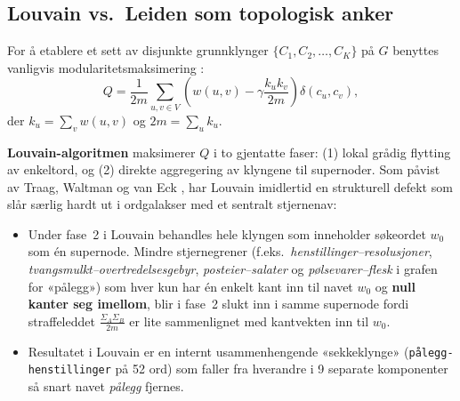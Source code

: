 \documentclass[11pt,a4paper]{article}
\begin{document}
\subsection{Louvain vs.\ Leiden som topologisk anker}
For å etablere et sett av disjunkte grunnklynger $\{C_1, C_2, \dots, C_K\}$ på $G$ benyttes vanligvis modularitetsmaksimering \cite{newman2004finding}:
\begin{equation}
  Q = \frac{1}{2m} \sum_{u, v \in V} \left( w(u, v) - \gamma \frac{k_u k_v}{2m} \right) \delta(c_u, c_v),
\end{equation}
der $k_u = \sum_{v} w(u, v)$ og $2m = \sum_u k_u$.

\textbf{Louvain-algoritmen} \cite{blondel2008fast} maksimerer $Q$ i to gjentatte faser: (1) lokal grådig flytting av enkeltord, og (2) direkte aggregering av klyngene til supernoder. Som påvist av Traag, Waltman og van Eck \cite{traag2019louvain}, har Louvain imidlertid en strukturell defekt som slår særlig hardt ut i ordgalakser med et sentralt stjernenav:
\begin{itemize}
  \item Under fase~2 i Louvain behandles hele klyngen som inneholder søkeordet $w_0$ som én supernode. Mindre stjernegrener (f.eks.\ \emph{henstillinger--resolusjoner}, \emph{tvangsmulkt--overtredelsesgebyr}, \emph{posteier--salater} og \emph{pølsevarer--flesk} i grafen for «pålegg») som hver kun har én enkelt kant inn til navet $w_0$ og \textbf{null kanter seg imellom}, blir i fase~2 slukt inn i samme supernode fordi straffeleddet $\frac{\Sigma_A \Sigma_B}{2m}$ er lite sammenlignet med kantvekten inn til $w_0$.
  \item Resultatet i Louvain er en internt usammenhengende «sekkeklynge» (\texttt{pålegg-henstillinger} på 52 ord) som faller fra hverandre i 9 separate komponenter så snart navet \emph{pålegg} fjernes.
\end{itemize}
\end{document}
